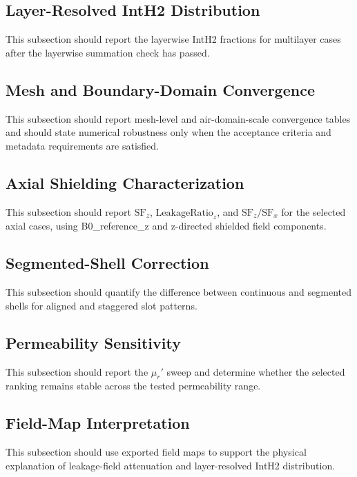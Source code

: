 ﻿\documentclass[letterpaper,journal]{IEEEtran}
\begin{document}
\subsection{Layer-Resolved IntH2 Distribution}

This subsection should report the layerwise IntH2 fractions for multilayer cases after the layerwise summation check has passed.

\subsection{Mesh and Boundary-Domain Convergence}

This subsection should report mesh-level and air-domain-scale convergence tables and should state numerical robustness only when the acceptance criteria and metadata requirements are satisfied.

\subsection{Axial Shielding Characterization}

This subsection should report $\mathrm{SF}_z$, $\mathrm{LeakageRatio}_z$, and $\mathrm{SF}_z/\mathrm{SF}_x$ for the selected axial cases, using B0\_reference\_z and z-directed shielded field components.

\subsection{Segmented-Shell Correction}

This subsection should quantify the difference between continuous and segmented shells for aligned and staggered slot patterns.

\subsection{Permeability Sensitivity}

This subsection should report the $\mu_r'$ sweep and determine whether the selected ranking remains stable across the tested permeability range.

\subsection{Field-Map Interpretation}

This subsection should use exported field maps to support the physical explanation of leakage-field attenuation and layer-resolved IntH2 distribution.
\end{document}
